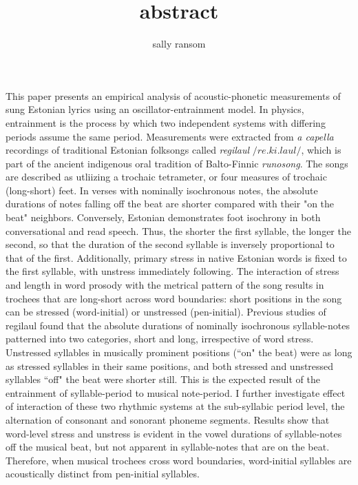 \documentclass[12pt]{article}
\title{abstract}
\author{sally ransom}
\begin{document}
\maketitle
This paper presents an empirical analysis of acoustic-phonetic measurements of sung Estonian lyrics using an oscillator-entrainment model. In physics, entrainment is the process by which two independent systems with differing periods assume the same period. 
Measurements were extracted from {\it a capella} recordings of traditional Estonian folksongs called {\it regilaul} \(/re.ki.laul/\), which is part of the ancient indigenous oral tradition of Balto-Finnic {\it runosong}. The songs are described as utliizing a trochaic tetrameter, or four measures of trochaic (long-short) feet. In verses with nominally isochronous notes, the absolute durations of notes falling off the beat are shorter compared with their "on the beat" neighbors.  Conversely, Estonian demonstrates foot isochrony in both conversational and read speech. Thus, the shorter the first syllable, the longer the second, so that the duration of the second syllable is inversely proportional to that of the first. Additionally, primary stress in native Estonian words is fixed to the first syllable, with unstress immediately following. The interaction of stress and length in word prosody with the metrical pattern of the song results in trochees that are long-short across word boundaries: short positions in the song can be stressed (word-initial) or unstressed (pen-initial). Previous studies of regilaul found that the absolute durations of nominally isochronous syllable-notes patterned into two categories, short and long, irrespective of word stress. Unstressed syllables in musically prominent positions (``on" the beat) were as long as stressed syllables in their same positions, and both stressed and unstressed syllables ``off" the beat were shorter still. This is the expected result of the entrainment of syllable-period to musical note-period. I further investigate effect of interaction of these two rhythmic systems at the sub-syllabic period level, the alternation of consonant and sonorant phoneme segments. Results show that word-level stress and unstress is evident in the vowel durations of syllable-notes off the musical beat, but not apparent in syllable-notes that are on the beat. Therefore, when musical trochees cross word boundaries, word-initial syllables are acoustically distinct from pen-initial syllables. 






\end{document}
